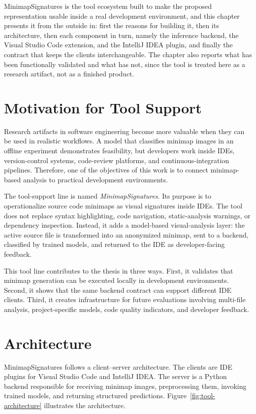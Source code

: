 MinimapSignatures is the tool ecosystem built to make the proposed
representation usable inside a real development environment, and this chapter
presents it from the outside in: first the reasons for building it, then its
architecture, then each component in turn, namely the inference backend, the
Visual Studio Code extension, and the IntelliJ IDEA plugin, and finally the
contract that keeps the clients interchangeable. The chapter also reports what
has been functionally validated and what has not, since the tool is treated
here as a research artifact, not as a finished product.

\section{Motivation for Tool Support}

Research artifacts in software engineering become more valuable when they can be
used in realistic workflows. A model that classifies minimap images in an
offline experiment demonstrates feasibility, but developers work inside IDEs,
version-control systems, code-review platforms, and continuous-integration
pipelines. Therefore, one of the objectives of this work is to
connect minimap-based analysis to practical development environments.

The tool-support line is named \textit{MinimapSignatures}. Its purpose is to
operationalize source code minimaps as visual signatures inside IDEs. The tool
does not replace syntax highlighting, code navigation, static-analysis warnings,
or dependency inspection. Instead, it adds a model-based visual-analysis layer:
the active source file is transformed into an anonymized minimap, sent to a
backend, classified by trained models, and returned to the IDE as developer-facing
feedback.

This tool line contributes to the thesis in three ways. First, it validates that
minimap generation can be executed locally in development environments. Second,
it shows that the same backend contract can support different IDE clients.
Third, it creates infrastructure for future evaluations involving multi-file
analysis, project-specific models, code quality indicators, and developer
feedback.

\section{Architecture}

MinimapSignatures follows a client--server architecture. The clients are IDE
plugins for Visual Studio Code and IntelliJ IDEA. The server is a Python backend
responsible for receiving minimap images, preprocessing them, invoking trained
models, and returning structured predictions. Figure~\ref{fig:tool-architecture}
illustrates the architecture.


